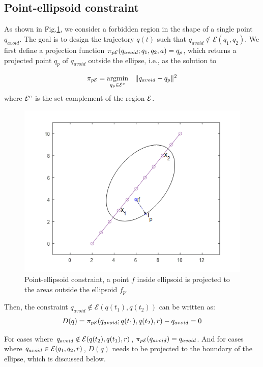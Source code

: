 \documentclass[journal]{IEEEtran}  %
\begin{document}
\subsection{Point-ellipsoid constraint}\label{sec:ellipsoid-point}
As shown in Fig.\ref{fig:Ellipse-to-point}, we consider a forbidden region in the shape of a single point $q_{avoid}$. The goal is to design the trajectory $q(t)$ such that $q_{avoid}\notin\mathcal{E}(q_1,q_2)$. We first define a projection function $\pi_{p\mathcal{E}}(q_{avoid};q_1,q_2,a) = q_p$, which returns a projected point $q_p$ of $q_{avoid}$ outside the ellipse, i.e., as the solution to


\begin{equation}\label{eq:ellipse-point-projection}
\pi_{p\mathcal{E}}=\operatorname*{\arg\!\min}_{q_p\in\mathcal{E}^c} \quad \lVert q_{avoid}-q_p\rVert^2 
\end{equation}
where $\mathcal{E}^{c}$ is the set complement of the region $\mathcal{E}$.
  
\begin{figure}[htbp]
\begin{center}
\includegraphics[width=0.6\linewidth]{Ellipse2point}
\caption{Point-ellipsoid constraint, a point $f$ inside ellipsoid is projected to the areas outside the ellipsoid $f_{p}$.}
\label{fig:Ellipse-to-point}
\end{center}
\end{figure}

  Then, the constraint $q_{avoid}\notin\mathcal{E}(q(t_1),q(t_2))$ can be written as:
  \begin{equation}
    D(q) = \pi_{p\mathcal{E}}(q_{avoid};q(t_1),q(t_2),r)-q_{avoid} = 0
  \end{equation}

  For cases where $q_{avoid} \notin \mathcal{E}(q(t_2),q(t_1),r)$, $\pi_{p\mathcal{E}}(q_{avoid}) = q_{avoid}$. And for cases where $q_{avoid} \in \mathcal{E}(q_1,q_2,r)$, $D(q)$ needs to be projected to the boundary of the ellipse, which is discussed below.
\end{document}
